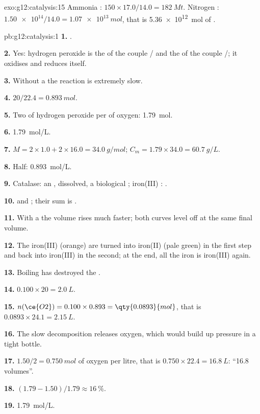 \begin{solution}{exo:g12:catalysis:15}
Ammonia : $150 \times 17.0 / 14.0 = \qty{182}{Mt}$. Nitrogen
: $\num{1.50e14} / 14.0 = \qty{1.07e13}{mol}$, that is
\qty{5.36e12}{mol} of .
\end{solution}

\begin{solution}{pb:g12:catalysis:1}
\textbf{1.} .

\textbf{2.} Yes: hydrogen peroxide is the  of the couple
/ and the  of the couple /; it
oxidises and reduces itself.

\textbf{3.} Without a  the reaction is extremely slow.

\textbf{4.} $20 / 22.4 = \qty{0.893}{mol}$.

\textbf{5.} Two  of hydrogen peroxide per  of oxygen:
\qty{1.79}{mol}.

\textbf{6.} \qty{1.79}{mol/L}.

\textbf{7.} $M = 2 \times 1.0 + 2 \times 16.0 = \qty{34.0}{g/mol}$;
$C_m = 1.79 \times 34.0 = \qty{60.7}{g/L}$.

\textbf{8.} Half: \qty{0.893}{mol/L}.

\textbf{9.} Catalase: an , dissolved, a biological ;
iron(III) : .

\textbf{10.}  and
; their sum is
.

\textbf{11.} With a  the volume rises much faster; both curves
level off at the same final volume.

\textbf{12.} The iron(III)  (orange) are turned into iron(II) (pale
green) in the first step and back into iron(III) in the second; at the
end, all the iron is iron(III) again.

\textbf{13.} Boiling has destroyed the .

\textbf{14.} $0.100 \times 20 = \qty{2.0}{L}$.

\textbf{15.} $n(\ce{O2}) = 0.100 \times 0.893 = \qty{0.0893}{mol}$, that
is $0.0893 \times 24.1 = \qty{2.15}{L}$.

\textbf{16.} The slow decomposition releases oxygen, which would build up
pressure in a tight bottle.

\textbf{17.} $1.50 / 2 = \qty{0.750}{mol}$ of oxygen per litre, that is
$0.750 \times 22.4 = \qty{16.8}{L}$: ``16.8 volumes''.

\textbf{18.} $(1.79 - 1.50)/1.79 \approx \qty{16}{\percent}$.

\textbf{19.} \qty{1.79}{mol/L}.
\end{solution}
